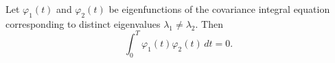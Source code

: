 Let $\varphi_1(t)$ and $\varphi_2(t)$ be eigenfunctions of the covariance integral equation
corresponding to distinct eigenvalues $\lambda_1 \neq \lambda_2$. Then
$$\int_0^T \varphi_1(t) \varphi_2(t) \, dt = 0.$$
